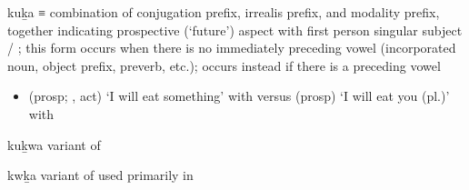\documentclass[12pt,letterpaper,oneside,article]{memoir}
\begin{document}
\begin{morphdesc}[resume*=alphalist]
\item[kuḵa]
	≡ 
	combination of  conjugation prefix,
		 irrealis prefix,
		and  modality prefix,
			together indicating prospective (‘future’) aspect
		with first person singular subject  / ;
	this form occurs when there is no
		immediately preceding vowel (incorporated noun, object prefix, preverb, etc.);
	 occurs instead if there is a preceding vowel
	\begin{itemize}
	\item	{} (prosp; ,  act) ‘I will eat something’
			with \newline
		versus  (prosp) ‘I will eat you (pl.)’
			with 
	\end{itemize}

\item[kuḵwa]
	variant of 
	
\item[kwḵa]
	variant of  used primarily in \cite{story-naish:1973}
\end{morphdesc}
\end{document}
